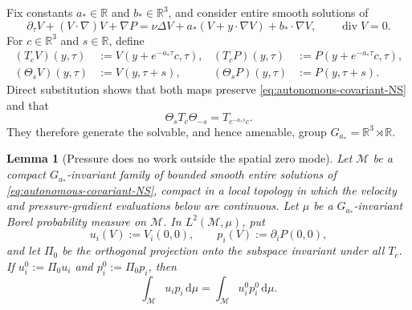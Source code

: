 \documentclass[11pt]{amsart}
\numberwithin{equation}{section}
\theoremstyle{plain}
\newtheorem{lemma}[lemma]{Lemma}
\theoremstyle{definition}
\theoremstyle{remark}
\newcommand{\R}{\mathbb R}
\newcommand{\dd}{\,\mathrm d}
\newcommand{\diver}{\operatorname{div}}
\begin{document}
Fix constants \(a_*\in\R\) and \(b_*\in\R^3\), and consider entire smooth
solutions of
\begin{equation}\label{eq:autonomous-covariant-NS}
 \partial_\tau V+(V\cdot\nabla)V+\nabla P
 =\nu\Delta V+a_*(V+y\cdot\nabla V)+b_*\cdot\nabla V,
 \qquad \diver V=0.
\end{equation}
For \(c\in\R^3\) and \(s\in\R\), define
\begin{align}
 (T_cV)(y,\tau)&:=V(y+e^{-a_*\tau}c,\tau),
 & (T_cP)(y,\tau)&:=P(y+e^{-a_*\tau}c,\tau),
 \label{eq:autonomous-covariant-translation}\\
 (\Theta_sV)(y,\tau)&:=V(y,\tau+s),
 & (\Theta_sP)(y,\tau)&:=P(y,\tau+s).
 \label{eq:autonomous-time-translation}
\end{align}
Direct substitution shows that both maps preserve
\eqref{eq:autonomous-covariant-NS} and that
\begin{equation}\label{eq:autonomous-semidirect-law}
 \Theta_sT_c\Theta_{-s}=T_{e^{-a_*s}c}.
\end{equation}
They therefore generate the solvable, and hence amenable, group
\(G_{a_*}=\R^3\rtimes\R\).

\begin{lemma}[Pressure does no work outside the spatial zero mode]
\label{lem:recurrent-pressure-cancellation}
Let \(\mathcal M\) be a compact \(G_{a_*}\)-invariant family of bounded
smooth entire solutions of \eqref{eq:autonomous-covariant-NS}, compact in a
local topology in which the velocity and pressure-gradient evaluations below
are continuous.  Let \(\mu\) be a \(G_{a_*}\)-invariant Borel probability
measure on \(\mathcal M\).  In \(L^2(\mathcal M,\mu)\), put
\[
 u_i(V):=V_i(0,0),
 \qquad p_i(V):=\partial_iP(0,0),
\]
and let \(\Pi_0\) be the orthogonal projection onto the subspace invariant
under all \(T_c\).  If \(u_i^0:=\Pi_0u_i\) and
\(p_i^0:=\Pi_0p_i\), then
\begin{equation}\label{eq:recurrent-pressure-work}
 \int_{\mathcal M}u_i p_i\dd\mu
 =\int_{\mathcal M}u_i^0p_i^0\dd\mu.
\end{equation}
\end{lemma}
\end{document}

